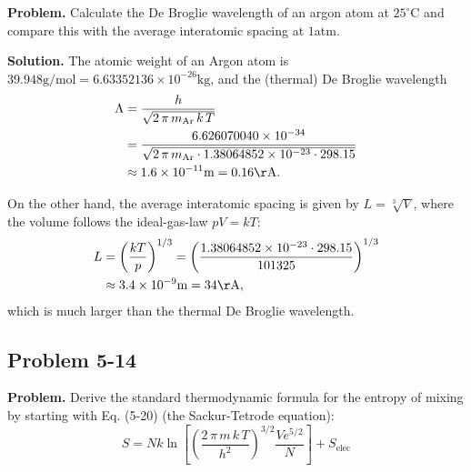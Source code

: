 \documentclass[twocolumn, 10pt]{article}
\numberwithin{equation}{section}
\newenvironment{problem}
{\par\medskip\sffamily \color{problue}
  \textbf{Problem. }\ignorespaces}
{\medskip}
\newenvironment{solution}
{\par\medskip
  \textbf{Solution. }\ignorespaces}
{\medskip}
\begin{document}
\begin{problem}
  Calculate the De Broglie wavelength of an argon atom at $25^{\circ}$C
  and compare this with the average interatomic spacing at $1$atm.
\end{problem}

\begin{solution}
The atomic weight of an Argon atom is
$39.948 \mathrm{g/mol} = 6.63352136\times 10^{-26} \mathrm{kg}$,
and the (thermal) De Broglie wavelength
\begin{align*}
\Lambda
  &= \frac{h}{ \sqrt{2\,\pi\,m_\mathrm{Ar}\,k\,T} }
  \\
  &= \frac{ 6.626070040 \times 10^{-34} }
  { \sqrt{2 \, \pi \, m_\mathrm{Ar} \cdot 1.38064852 \times 10^{-23} \cdot 298.15} }
  \\
  &\approx 1.6\times10^{-11}\mathrm{m} = 0.16\mathrm{\AA}.
\end{align*}

On the other hand,
the average interatomic spacing
  is given by $L = \sqrt[3]{V}$,
where the volume follows the ideal-gas-law $pV = kT$:
\begin{align*}
  L
  &= \left(\frac{ kT } { p} \right)^{1/3}
  = \left(
  \frac{ 1.38064852 \times 10^{-23} \cdot 298.15 }
  { 101325 } \right)^{1/3}
  \\
  &\approx 3.4\times10^{-9} \mathrm{m}
  = 34\mathrm{\AA},
\end{align*}
which is much larger than the thermal De Broglie wavelength.
%
\end{solution}

\subsection{Problem 5-14}

\begin{problem}
  Derive the standard thermodynamic formula for the entropy of mixing
  by starting with Eq. (5-20) (the Sackur-Tetrode equation):
  \begin{equation}
    S = N k \ln \left[
      \left( \frac{ 2 \, \pi \, m \, k \, T } { h^2 }
      \right)^{3/2}
      \frac{ V e^{5/2} } { N }
      \right] + S_\mathrm{elec}
    \tag{5-20}
    \label{eq:Sstd}
  \end{equation}
\end{problem}
\end{document}
